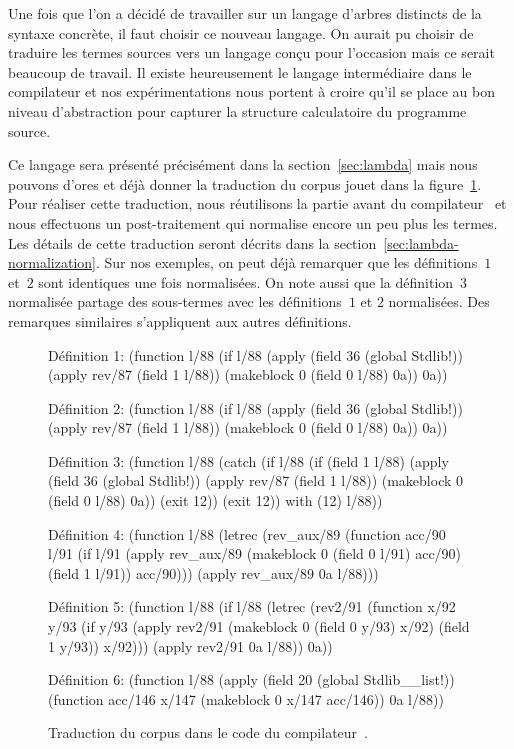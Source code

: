 Une fois que l'on a décidé de travailler sur un langage d'arbres
distincts de la syntaxe concrète, il faut choisir ce nouveau langage.
On aurait pu choisir de traduire les termes sources vers un langage
conçu pour l'occasion mais ce serait beaucoup de travail. Il existe
heureusement le langage intermédiaire {\LambdaCode} dans le
compilateur et nos expérimentations nous portent à croire qu'il se
place au bon niveau d'abstraction pour capturer la structure
calculatoire du programme source.

Ce langage sera présenté précisément dans la section~\ref{sec:lambda}
mais nous pouvons d'ores et déjà donner la traduction du corpus jouet
dans la figure~\ref{fig:lambda-corpus}. Pour réaliser cette
traduction, nous réutilisons la partie avant du compilateur~{\OCaml}
et nous effectuons un post-traitement qui normalise encore un peu plus
les termes. Les détails de cette traduction seront décrits dans la
section~\ref{sec:lambda-normalization}. Sur nos exemples, on peut déjà
remarquer que les définitions~$1$ et~$2$ sont identiques une fois
normalisées. On note aussi que la définition~$3$ normalisée partage
des sous-termes avec les définitions~$1$ et $2$ normalisées. Des
remarques similaires s'appliquent aux autres définitions.

\begin{figure}
\begin{lisp}
Définition 1: (function l/88
  (if l/88
    (apply (field 36 (global Stdlib!)) (apply rev/87 (field 1 l/88))
      (makeblock 0 (field 0 l/88) 0a))
    0a))

Définition 2: (function l/88
  (if l/88
    (apply (field 36 (global Stdlib!)) (apply rev/87 (field 1 l/88))
      (makeblock 0 (field 0 l/88) 0a))
    0a))

Définition 3: (function l/88
  (catch
    (if l/88
      (if (field 1 l/88)
        (apply (field 36 (global Stdlib!)) (apply rev/87 (field 1 l/88))
          (makeblock 0 (field 0 l/88) 0a))
        (exit 12))
      (exit 12))
   with (12) l/88))

Définition 4: (function l/88
  (letrec
    (rev_aux/89
       (function acc/90 l/91
         (if l/91
           (apply rev_aux/89 (makeblock 0 (field 0 l/91) acc/90)
             (field 1 l/91))
           acc/90)))
    (apply rev_aux/89 0a l/88)))

Définition 5: (function l/88
  (if l/88
    (letrec
      (rev2/91
         (function x/92 y/93
           (if y/93
             (apply rev2/91 (makeblock 0 (field 0 y/93) x/92) (field 1 y/93))
             x/92)))
      (apply rev2/91 0a l/88))
    0a))

Définition 6: (function l/88
  (apply (field 20 (global Stdlib__list!))
    (function acc/146 x/147 (makeblock 0 x/147 acc/146)) 0a l/88))
\end{lisp}
\caption{Traduction du corpus dans le code {\LambdaCode} du compilateur~\OCaml.}
\label{fig:lambda-corpus}
\end{figure}

